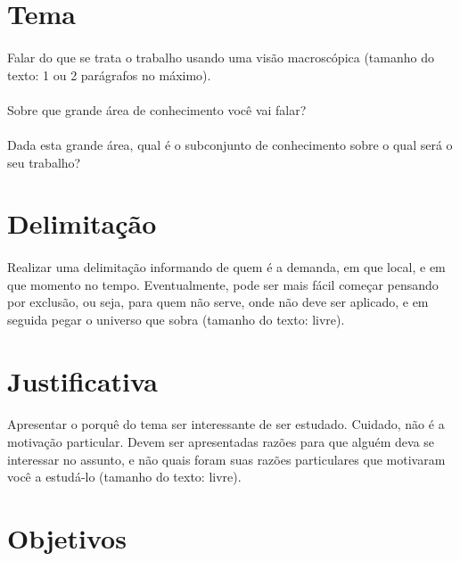 \section{Tema}

\paragraph{}Falar do que se trata o trabalho usando uma visão macroscópica (tamanho do texto: 1 ou 2 parágrafos no máximo).

\paragraph{}Sobre que grande área de conhecimento você vai falar?

\paragraph{}Dada esta grande área, qual é o subconjunto de conhecimento sobre o qual será o seu trabalho?


\section{Delimitação}

\paragraph{}Realizar uma delimitação informando de quem é a demanda, em que local, e em que momento no tempo. Eventualmente, pode ser mais fácil começar pensando por exclusão, ou seja, para quem não serve, onde não deve ser aplicado, e em seguida pegar o universo que sobra (tamanho do texto: livre).


\section{Justificativa}

\paragraph{}Apresentar o porquê do tema ser interessante de ser estudado. Cuidado, não é a motivação particular. Devem ser apresentadas razões para que alguém deva se interessar no assunto, e não quais foram suas razões particulares que motivaram você a estudá-lo (tamanho do texto: livre).


\section{Objetivos}

